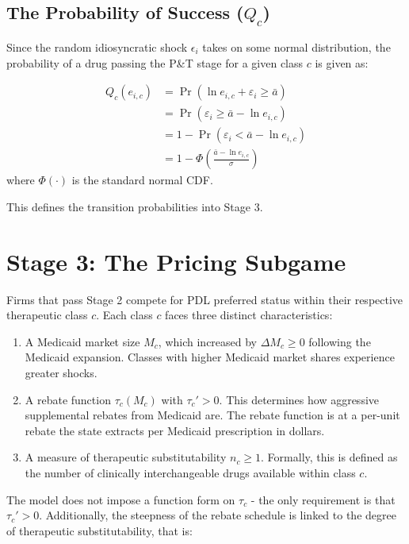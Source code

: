 \documentclass[12pt]{article}
\begin{document}
\subsection{The Probability of Success \texorpdfstring{($Q_c$)}{(Qc)}}
Since the random idiosyncratic shock $\epsilon_i$ takes on some normal distribution, the probability of a drug passing the P\&T stage for a given class $c$ is given as:

\begin{align}
    Q_c(e_{i,c}) &= \Pr(\ln e_{i,c} + \varepsilon_i \geq \bar{a}) \\
           &= \Pr(\varepsilon_i \geq \bar{a} - \ln e_{i,c}) \\
           &= 1 - \Pr(\varepsilon_i < \bar{a} - \ln e_{i,c}) \\
           &= 1 - \Phi\left(\frac{\bar{a} - \ln e_{i,c}}{\sigma}\right)
\end{align}
where $\Phi(\cdot)$ is the standard normal CDF. \vspace{1em}

This defines the transition probabilities into Stage 3.

\newpage

\section{Stage 3: The Pricing Subgame}
Firms that pass Stage 2 compete for PDL preferred status within their respective therapeutic class $c$. Each class $c$ faces three distinct characteristics:

\begin{enumerate}[label=(\roman*)]
    \item A Medicaid market size $M_c$, which increased by $\Delta M_c \geq 0$ following the Medicaid expansion. Classes with higher Medicaid market shares experience greater shocks.
    
    \item A rebate function $\tau_c(M_c)$ with $\tau_c' > 0$. This determines how aggressive supplemental rebates from Medicaid are. The rebate function is at a  per-unit rebate the state extracts per Medicaid prescription in dollars.
    
    \item A measure of therapeutic substitutability $n_c \geq 1$. Formally, this is defined as the number of clinically interchangeable drugs available within class $c$.
\end{enumerate}

The model does not impose a function form on $\tau_c$ - the only requirement is that $\tau_c' > 0$. Additionally, the steepness of the rebate schedule is linked to the degree of therapeutic substitutability, that is:
\end{document}
